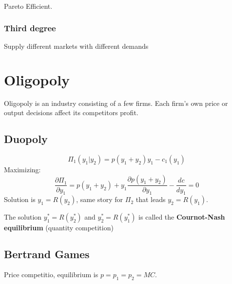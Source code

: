 \documentclass[a4paper] {scrartcl}
\begin{document}
Pareto Efficient.

\subsubsection{Third degree}
Supply different markets with different demands


\section{Oligopoly}
Oligopoly is an industry consisting of a few firms. Each firm's own price or output decisions affect its competitors profit.

\subsection{Duopoly}
\begin{equation}
	\Pi_1(y_1|y_2) = p(y_1+y_2)y_1-c_1(y_1)
\end{equation}
Maximizing:
\begin{equation}
	\frac{\partial \Pi_1}{\partial y_1}=
	p(y_1+y_2) + y_1\frac{\partial p(y_1+y_2)}{\partial y_1}
	- \frac{dc}{dy_1}=0
\end{equation}
Solution is $y_1=R(y_2)$, same story for $\Pi_2$ that leads $y_2 = R(y_1)$.

The solution $y_1^*=R(y_2^*)$ and $y_2^*=R(y_1^*)$ is called the \textbf{Cournot-Nash equilibrium} (quantity competition)


\subsection{Bertrand Games}
Price competitio, equilibrium is $p=p_1=p_2 = MC$.
\end{document}
